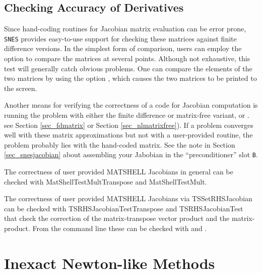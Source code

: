 \subsection{Checking Accuracy of Derivatives}
\label{sec_snesderivs}

Since hand-coding routines for Jacobian matrix evaluation
can be error prone, \lstinline{SNES} provides easy-to-use support for checking
these matrices against finite difference versions.  In the simplest
form of comparison, users can employ the option 
to compare the matrices at several points.  Although not exhaustive,
this test will generally catch obvious problems.  One can compare the
elements of the two matrices by using the option 
 , which causes the two
matrices to be printed to the screen.  

Another means for verifying the correctness of a code for Jacobian
computation is running the problem with either the finite
difference or matrix-free variant,  or .
see Section \ref{sec_fdmatrix} or Section \ref{sec_nlmatrixfree}).
If a problem converges well
with these matrix approximations but not with a user-provided routine,
the problem probably lies with the hand-coded
matrix. 
See the note in Section \ref{sec_snesjacobian} about assembling your Jabobian
in the ``preconditioner'' slot \lstinline{B}.

The correctness of user provided MATSHELL Jacobians in general can be checked with
MatShellTestMultTranspose and MatShellTestMult.

The correctness of user provided MATSHELL Jacobians via TSSetRHSJacobian can be checked with
TSRHSJacobianTestTranspose and TSRHSJacobianTest that check the correction of the matrix-transpose vector product and the matrix-product. From
the command line these can be checked with    and  .



\section{Inexact Newton-like Methods}

